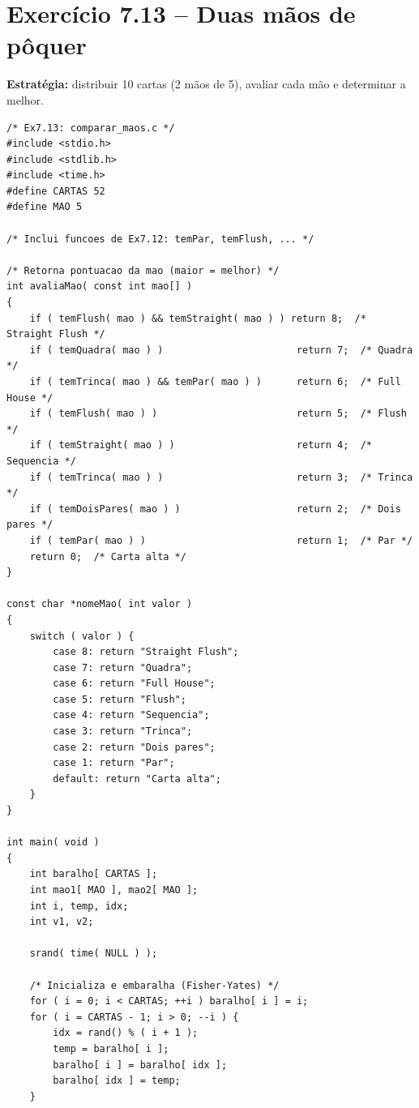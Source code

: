 \documentclass[12pt,a4paper]{article}
\begin{document}
\newpage

\section{Exercício 7.13 -- Duas mãos de pôquer}

\begin{respostabox}
\textbf{Estratégia:} distribuir 10 cartas (2 mãos de 5), avaliar cada mão e
determinar a melhor.

\begin{lstlisting}
/* Ex7.13: comparar_maos.c */
#include <stdio.h>
#include <stdlib.h>
#include <time.h>
#define CARTAS 52
#define MAO 5

/* Inclui funcoes de Ex7.12: temPar, temFlush, ... */

/* Retorna pontuacao da mao (maior = melhor) */
int avaliaMao( const int mao[] )
{
    if ( temFlush( mao ) && temStraight( mao ) ) return 8;  /* Straight Flush */
    if ( temQuadra( mao ) )                       return 7;  /* Quadra */
    if ( temTrinca( mao ) && temPar( mao ) )      return 6;  /* Full House */
    if ( temFlush( mao ) )                        return 5;  /* Flush */
    if ( temStraight( mao ) )                     return 4;  /* Sequencia */
    if ( temTrinca( mao ) )                       return 3;  /* Trinca */
    if ( temDoisPares( mao ) )                    return 2;  /* Dois pares */
    if ( temPar( mao ) )                          return 1;  /* Par */
    return 0;  /* Carta alta */
}

const char *nomeMao( int valor )
{
    switch ( valor ) {
        case 8: return "Straight Flush";
        case 7: return "Quadra";
        case 6: return "Full House";
        case 5: return "Flush";
        case 4: return "Sequencia";
        case 3: return "Trinca";
        case 2: return "Dois pares";
        case 1: return "Par";
        default: return "Carta alta";
    }
}

int main( void )
{
    int baralho[ CARTAS ];
    int mao1[ MAO ], mao2[ MAO ];
    int i, temp, idx;
    int v1, v2;

    srand( time( NULL ) );

    /* Inicializa e embaralha (Fisher-Yates) */
    for ( i = 0; i < CARTAS; ++i ) baralho[ i ] = i;
    for ( i = CARTAS - 1; i > 0; --i ) {
        idx = rand() % ( i + 1 );
        temp = baralho[ i ];
        baralho[ i ] = baralho[ idx ];
        baralho[ idx ] = temp;
    }


\end{lstlisting}
\end{respostabox}
\end{document}
